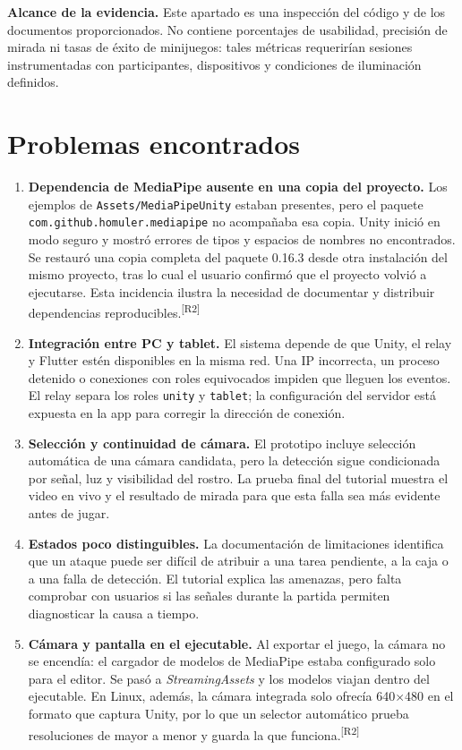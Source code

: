 \documentclass[11pt,a4paper]{article}
\newcommand{\codigo}[1]{\texttt{#1}}
\newcommand{\cita}[1]{\textsuperscript{\textcolor{Rojo}{[#1]}}}
\begin{document}
\textbf{Alcance de la evidencia.} Este apartado es una inspección del código y de los documentos proporcionados. No contiene porcentajes de usabilidad, precisión de mirada ni tasas de éxito de minijuegos: tales métricas requerirían sesiones instrumentadas con participantes, dispositivos y condiciones de iluminación definidos.

\section{Problemas encontrados}

\begin{enumerate}
  \item \textbf{Dependencia de MediaPipe ausente en una copia del proyecto.} Los ejemplos de \codigo{Assets/MediaPipeUnity} estaban presentes, pero el paquete \codigo{com.github.homuler.mediapipe} no acompañaba esa copia. Unity inició en modo seguro y mostró errores de tipos y espacios de nombres no encontrados. Se restauró una copia completa del paquete 0.16.3 desde otra instalación del mismo proyecto, tras lo cual el usuario confirmó que el proyecto volvió a ejecutarse. Esta incidencia ilustra la necesidad de documentar y distribuir dependencias reproducibles.\cita{R2}
  \item \textbf{Integración entre PC y tablet.} El sistema depende de que Unity, el relay y Flutter estén disponibles en la misma red. Una IP incorrecta, un proceso detenido o conexiones con roles equivocados impiden que lleguen los eventos. El relay separa los roles \codigo{unity} y \codigo{tablet}; la configuración del servidor está expuesta en la app para corregir la dirección de conexión.
  \item \textbf{Selección y continuidad de cámara.} El prototipo incluye selección automática de una cámara candidata, pero la detección sigue condicionada por señal, luz y visibilidad del rostro. La prueba final del tutorial muestra el video en vivo y el resultado de mirada para que esta falla sea más evidente antes de jugar.
  \item \textbf{Estados poco distinguibles.} La documentación de limitaciones identifica que un ataque puede ser difícil de atribuir a una tarea pendiente, a la caja o a una falla de detección. El tutorial explica las amenazas, pero falta comprobar con usuarios si las señales durante la partida permiten diagnosticar la causa a tiempo.
  \item \textbf{Cámara y pantalla en el ejecutable.} Al exportar el juego, la cámara no se encendía: el cargador de modelos de MediaPipe estaba configurado solo para el editor. Se pasó a \textit{StreamingAssets} y los modelos viajan dentro del ejecutable. En Linux, además, la cámara integrada solo ofrecía 640$\times$480 en el formato que captura Unity, por lo que un selector automático prueba resoluciones de mayor a menor y guarda la que funciona.\cita{R2}

\end{enumerate}
\end{document}
